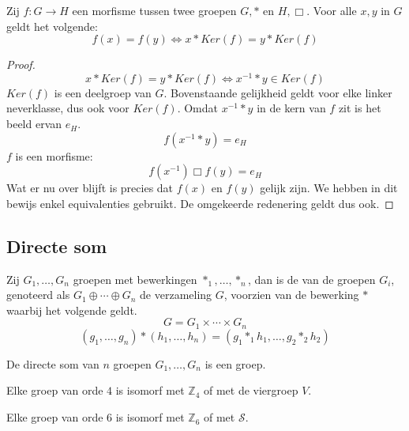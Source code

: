 \documentclass[main.tex]{subfiles}
\begin{document}
\begin{st}
  Zij $f: G \rightarrow H$ een morfisme tussen twee groepen $G,*$ en $H,\Box$. Voor alle $x,y$ in $G$ geldt het volgende:
  \[ f(x) = f(y) \Leftrightarrow x * Ker(f) = y * Ker(f) \]

  \begin{proof}
    \[ x * Ker(f) = y * Ker(f) \Leftrightarrow x^{-1} * y \in Ker(f) \]
    $Ker(f)$ is een deelgroep van $G$.
    Bovenstaande gelijkheid geldt voor elke linker neverklasse, dus ook voor $Ker(f)$.
    Omdat $x^{-1} * y$ in de kern van $f$ zit is het beeld ervan $e_{H}$.
    \[ f(x^{-1} * y) = e_{H} \]
    $f$ is een morfisme:
    \[ f(x^{-1}) \Box f(y) = e_{H}\]
    Wat er nu over blijft is precies dat $f(x)$ en $f(y)$ gelijk zijn.
    We hebben in dit bewijs enkel equivalenties gebruikt. De omgekeerde redenering geldt dus ook.
  \end{proof}
\end{st}

\subsection{Directe som}
\label{sec:directe-som}

\begin{de}
  Zij $G_{1},\dotsc,G_{n}$ groepen met bewerkingen $*_{1},\dotsc,*_{n}$, dan is de  van de groepen $G_{i}$, genoteerd als $G_{1} \oplus \dotsb \oplus G_{n}$ de verzameling $G$, voorzien van de bewerking $*$ waarbij het volgende geldt.
  \[
  G = G_{1} \times \dotsb \times G_{n}
  \]
  \[
  (g_{1},\dotsc,g_{n}) *(h_{1},\dotsc,h_{n}) = (g_{1} *_{1} h_{1}, \dotsc, g_{2} *_{2} h_{2})
  \]
\end{de}

\begin{st}
  De directe som van $n$ groepen $G_{1},\dotsc,G_{n}$ is een groep.

\end{st}

\begin{ei}
  \label{ei:groep-orde-vier}
  Elke groep van orde $4$ is isomorf met $\mathbb{Z}_{4}$ of met de viergroep $V$.

\end{ei}

\begin{ei}
  \label{ei-groep-orde-zes}
  Elke groep van orde $6$ is isomorf met $\mathbb{Z}_{6}$ of met $\mathcal{S}$. 

\end{ei}
\end{document}
